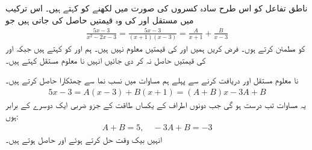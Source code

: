 ناطق تفاعل کو اس طرح سادہ کسروں کی صورت میں لکھنے کو  کہتے ہیں۔ اس ترکیب میں مستقل  اور  کی وہ قیمتیں حاصل کی جاتی ہیں جو
\begin{align}\label{مساوات_طریقہ_جزوی_کسر_ب}
\frac{5x-3}{x^2-2x-3}=\frac{5x-3}{(x+1)(x-3)}=\frac{A}{x+1}+\frac{B}{x-3}
\end{align}
کو مطمئن کرتے ہوں۔ فرض کریں ہمیں  اور  کی قیمتیں معلوم نہیں ہیں۔ ہم  اور  کو  کہتے ہیں جبکہ   اور  کی قیمتیں حاصل نہ کر دی جائیں انہیں نا معلوم مستقل کہتے ہیں۔ 

نا معلوم مستقل  اور  دریافت کرنے سے پہلے ہم مساوات  میں نسب نما سے چھٹکارا حاصل کرتے ہیں۔
\begin{align*}
5x-3=A(x-3)+B(x+1)=(A+B)x-3A+B
\end{align*}
یہ مساوات تب درست ہو گی جب دونوں اطراف  کے یکساں طاقت کے جزو ضربی ایک دوسرے کے برابر ہوں:
\begin{align*}
A+B=5,\quad -3A+B=-3
\end{align*}
انہیں بیک وقت حل کرتے ہوئے  اور  حاصل ہوتے ہیں۔

